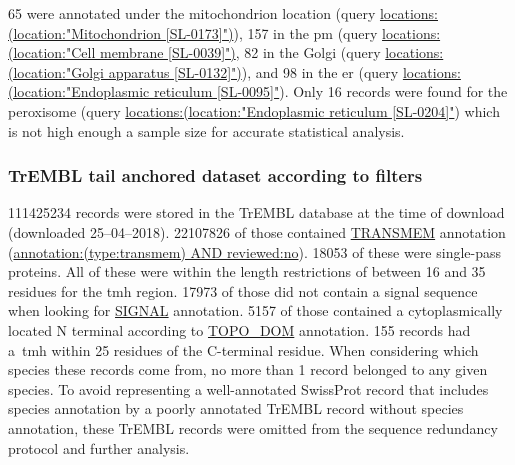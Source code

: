 65 were annotated under the mitochondrion location (query \url{locations:(location:"Mitochondrion [SL-0173]")}), 157 in the \gls{pm} (query \url{locations:(location:"Cell membrane [SL-0039]")}, 82 in the Golgi (query \url{locations:(location:"Golgi apparatus [SL-0132]")}), and 98 in the \gls{er} (query \url{locations:(location:"Endoplasmic reticulum [SL-0095]"}).
Only 16 records were found for the peroxisome (query \url{locations:(location:"Endoplasmic reticulum [SL-0204]"}) which is not high enough a sample size for accurate statistical analysis.


\subsubsection{TrEMBL tail anchored dataset according to filters}
111425234 records were stored in the TrEMBL database at the time of download (downloaded 25--04--2018).
22107826 of those contained \url{TRANSMEM} annotation (\url{annotation:(type:transmem) AND reviewed:no}).
18053 of these were single\--pass proteins.
All of these were within the length restrictions of between 16 and 35 residues for the \gls{tmh} region.
17973 of those did not contain a signal sequence when looking for \url{SIGNAL} annotation.
5157 of those contained a cytoplasmically located N terminal according to \url{TOPO_DOM} annotation.
155 records had a~\gls{tmh} within 25 residues of the C\--terminal residue.
When considering which species these records come from, no more than 1 record belonged to any given species.
To avoid representing a well\--annotated SwissProt record that includes species annotation by a poorly annotated TrEMBL record without species annotation, these TrEMBL records were omitted from the sequence redundancy protocol and further analysis.

